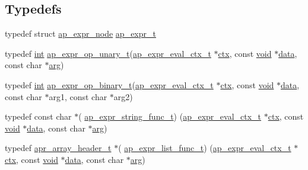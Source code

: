 \subsection*{Typedefs}
\begin{DoxyCompactItemize}
\item 
typedef struct \hyperlink{structap__expr__node}{ap\+\_\+expr\+\_\+node} \hyperlink{group__AP__EXPR_ga1495a85c3a89e64cf625dfe1a5905fcb}{ap\+\_\+expr\+\_\+t}
\item 
typedef \hyperlink{pcre_8txt_a42dfa4ff673c82d8efe7144098fbc198}{int} \hyperlink{group__AP__EXPR_ga8069c0c1ecbf4d1804fcfd4b2132ce28}{ap\+\_\+expr\+\_\+op\+\_\+unary\+\_\+t}(\hyperlink{structap__expr__eval__ctx__t}{ap\+\_\+expr\+\_\+eval\+\_\+ctx\+\_\+t} $\ast$\hyperlink{group__APR__Util__Bucket__Brigades_ga0525238c5b09cb4ac5067ddec654d09c}{ctx}, const \hyperlink{group__MOD__ISAPI_gacd6cdbf73df3d9eed42fa493d9b621a6}{void} $\ast$\hyperlink{structdata}{data}, const char $\ast$\hyperlink{group__APACHE__CORE__MUTEX_gaf6517210150d97cd5cb8a17e3768770d}{arg})
\item 
typedef \hyperlink{pcre_8txt_a42dfa4ff673c82d8efe7144098fbc198}{int} \hyperlink{group__AP__EXPR_gaa895dbebc552cf2357b653e5adb53980}{ap\+\_\+expr\+\_\+op\+\_\+binary\+\_\+t}(\hyperlink{structap__expr__eval__ctx__t}{ap\+\_\+expr\+\_\+eval\+\_\+ctx\+\_\+t} $\ast$\hyperlink{group__APR__Util__Bucket__Brigades_ga0525238c5b09cb4ac5067ddec654d09c}{ctx}, const \hyperlink{group__MOD__ISAPI_gacd6cdbf73df3d9eed42fa493d9b621a6}{void} $\ast$\hyperlink{structdata}{data}, const char $\ast$arg1, const char $\ast$arg2)
\item 
typedef const char $\ast$( \hyperlink{group__AP__EXPR_gada66631d39bfe2affd40b4ed27d96af8}{ap\+\_\+expr\+\_\+string\+\_\+func\+\_\+t}) (\hyperlink{structap__expr__eval__ctx__t}{ap\+\_\+expr\+\_\+eval\+\_\+ctx\+\_\+t} $\ast$\hyperlink{group__APR__Util__Bucket__Brigades_ga0525238c5b09cb4ac5067ddec654d09c}{ctx}, const \hyperlink{group__MOD__ISAPI_gacd6cdbf73df3d9eed42fa493d9b621a6}{void} $\ast$\hyperlink{structdata}{data}, const char $\ast$\hyperlink{group__APACHE__CORE__MUTEX_gaf6517210150d97cd5cb8a17e3768770d}{arg})
\item 
typedef \hyperlink{structapr__array__header__t}{apr\+\_\+array\+\_\+header\+\_\+t} $\ast$( \hyperlink{group__AP__EXPR_gad7338728ffd7484f1426f2c1f3f19ac0}{ap\+\_\+expr\+\_\+list\+\_\+func\+\_\+t}) (\hyperlink{structap__expr__eval__ctx__t}{ap\+\_\+expr\+\_\+eval\+\_\+ctx\+\_\+t} $\ast$\hyperlink{group__APR__Util__Bucket__Brigades_ga0525238c5b09cb4ac5067ddec654d09c}{ctx}, const \hyperlink{group__MOD__ISAPI_gacd6cdbf73df3d9eed42fa493d9b621a6}{void} $\ast$\hyperlink{structdata}{data}, const char $\ast$\hyperlink{group__APACHE__CORE__MUTEX_gaf6517210150d97cd5cb8a17e3768770d}{arg})

\end{DoxyCompactItemize}
